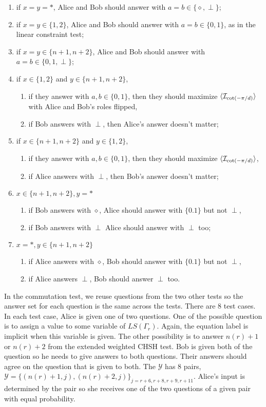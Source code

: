 \documentclass[11pt,letterpaper]{article}
\DeclarePairedDelimiter{\ip}{\langle}{\rangle}
\newcommand{\calY}{\mathcal{Y}}
\newcommand{\1}{\mathbb{1}}
\newcommand{\LS}{LS}
\newcommand{\nr}{n(r)}
\newcommand{\I}{\mathcal{I}}
\theoremstyle{definition}
\begin{document}
\begin{enumerate}
	\item if $x = y = \ast$, Alice and Bob should answer with $a = b \in \{\diamond, \perp\}$;
	\item if $x = y \in \{1,2\}$, Alice and Bob should answer with $a = b \in \{0, 1\}$, as in the linear constraint test;
	\item if $x = y \in \{n+1, n+2\}$, Alice and Bob should answer with $a = b \in \{0, 1, \perp\}$;
	\item if $x \in \{1,2\}$ and $y \in \{n+1, n+2\}$, 
		\begin{enumerate}
		\item if they answer with $a,b \in \{0,1\}$, then
	they should maximize $\ip{\I_{\cot(-\pi/d)}}$ with Alice and Bob's roles flipped, 
		\item if Bob answers with $\perp$, then Alice's answer doesn't matter;
		\end{enumerate}
	\item if $x \in \{n+1, n+2\}$ and $y \in \{1,2\}$,
	\begin{enumerate} 
		\item if they answer with $a,b \in \{0,1\}$, then
		they should maximize $\ip{\I_{\cot(-\pi/d)}}$, 
		\item if Alice answers with $\perp$, then Bob's answer doesn't matter;
	\end{enumerate}
	\item $x \in \{n+1,n+2\}, y = \ast$ 
		\begin{enumerate}
		\item if Bob answers with $\diamond$, Alice should answer with $\{0.1\}$ but not $\perp$, 
		\item if Bob answers with $\perp$ Alice should answer with $\perp$ too;
		\end{enumerate}
	\item $x = \ast, y \in \{n+1, n+2\}$
	\begin{enumerate}
		\item if Alice answers with $\diamond$, Bob should answer with $\{0.1\}$ but not $\perp$, 
		\item if Alice answers $\perp$, Bob should answer $\perp$ too.
	\end{enumerate}
\end{enumerate}

In the commutation test, 
we reuse questions from the two other tests so the answer
set for each question is the same across the tests.
There are $8$ test cases.
In each test case, Alice is given one of two questions.
One of the possible question is to assign a value to some variable of $\LS(\Gamma_r)$.
Again, the equation label is implicit when this variable is given.
The other possibility is to answer $\nr+1$ or $\nr+2$ from the extended weighted CHSH test.
Bob is given both of the question so he needs to give answers to both questions.
Their answers should agree on the question that is given to both.
The $\calY$ has $8$ pairs, $\calY = \{ (\nr+1, j), (\nr+2, j) \}_{j = r+6, r+8, r+9, r+11}$.
Alice's input is determined by the pair so she receives one of the two questions of a given pair with equal probability.
\end{document}
